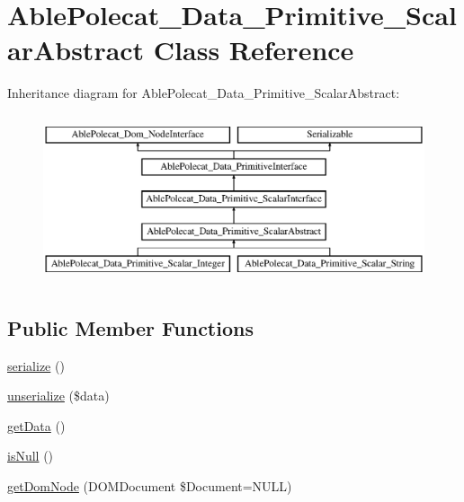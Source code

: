 \hypertarget{class_able_polecat___data___primitive___scalar_abstract}{}\section{Able\+Polecat\+\_\+\+Data\+\_\+\+Primitive\+\_\+\+Scalar\+Abstract Class Reference}
\label{class_able_polecat___data___primitive___scalar_abstract}
Inheritance diagram for Able\+Polecat\+\_\+\+Data\+\_\+\+Primitive\+\_\+\+Scalar\+Abstract\+:\begin{figure}[H]
\begin{center}
\leavevmode
\includegraphics[height=5.000000cm]{class_able_polecat___data___primitive___scalar_abstract}
\end{center}
\end{figure}
\subsection*{Public Member Functions}
\begin{DoxyCompactItemize}
\item 
\hyperlink{class_able_polecat___data___primitive___scalar_abstract_a4d9813fea8525b19a1d370eeb8fe41d6}{serialize} ()
\item 
\hyperlink{class_able_polecat___data___primitive___scalar_abstract_a91b3cb8a65e42152cacf1cf222bd26f6}{unserialize} (\$data)
\item 
\hyperlink{class_able_polecat___data___primitive___scalar_abstract_a81a67162a6288d78fc4c55283325f0b4}{get\+Data} ()
\item 
\hyperlink{class_able_polecat___data___primitive___scalar_abstract_a4af7cea238ab52f6e40a1eed86bdc1be}{is\+Null} ()
\item 
\hyperlink{class_able_polecat___data___primitive___scalar_abstract_a3241c66cb1cbb7b720be191808876012}{get\+Dom\+Node} (D\+O\+M\+Document \$Document=N\+U\+L\+L)
\end{DoxyCompactItemize}
